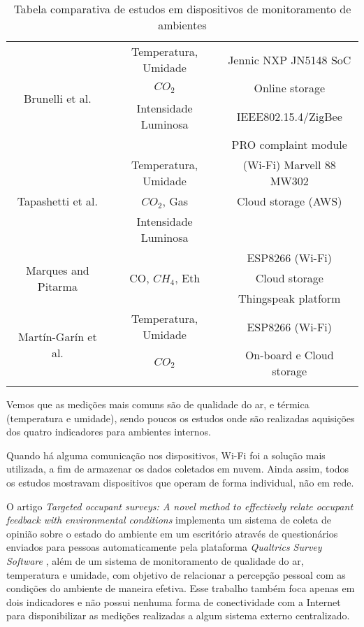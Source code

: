 \documentclass[../monografia.tex]{subfiles}
\begin{document}
\begin{center}
\begin{longtable}{ c c c }
\hline %
\multirow{4}{8em}{Brunelli et al.\cite{Brunelli2014}} & Temperatura, Umidade & Jennic NXP JN5148 %
SoC \\
& $CO_{2}$ & Online storage \\ 
& Intensidade Luminosa & IEEE802.15.4/ZigBee \\ 
&  & PRO complaint module \\ 

\hline %
\multirow{3}{8em}{Tapashetti et al.\cite{Tapashetti2016}} & Temperatura, Umidade & (Wi-Fi) Marvell 88 MW302 \\
& $CO_{2}$, Gas & Cloud storage (AWS) \\ 
& Intensidade Luminosa &  \\ %

\hline %
\multirow{3}{8em}{Marques and Pitarma\cite{Marques2019}} & \multirow{3}{8em}{CO, $CH_{4}$, Eth} & ESP8266 (Wi-Fi)\\
&  & Cloud storage \\ 
&  & Thingspeak platform \\

\hline %
\multirow{2}{8em}{Martín-Garín et al.\cite{MARTINGARIN2018201}} & Temperatura, Umidade & ESP8266 (Wi-Fi)\\
& $CO_{2}$ & On-board e Cloud storage \\ 

\bottomrule 
\caption{Tabela comparativa de estudos em dispositivos de monitoramento de ambientes}
\label{table:estudos}
\end{longtable}
\end{center}

Vemos que as medições mais comuns são de qualidade do ar, e térmica (temperatura e umidade), sendo poucos os estudos onde são realizadas aquisições dos quatro indicadores para ambientes internos. 

Quando há alguma comunicação nos dispositivos, Wi-Fi foi a solução mais utilizada, a fim de armazenar os dados coletados em nuvem. Ainda assim, todos os estudos mostravam dispositivos que operam de forma individual, não em rede. 

O artigo \textit{Targeted occupant surveys: A novel method to effectively relate occupant feedback with environmental conditions} \cite{trabalho-feedback} implementa um sistema de coleta de opinião sobre o estado do ambiente em um escritório através de questionários enviados para pessoas automaticamente pela plataforma \textit{Qualtrics Survey Software} \cite{qualitrics}, além de um sistema de monitoramento de qualidade do ar, temperatura e umidade, com objetivo de relacionar a percepção pessoal com as condições do ambiente de maneira efetiva. Esse trabalho também foca apenas em dois indicadores e não possui nenhuma forma de conectividade com a Internet para disponibilizar as medições realizadas a algum sistema externo centralizado. 
\end{document}
